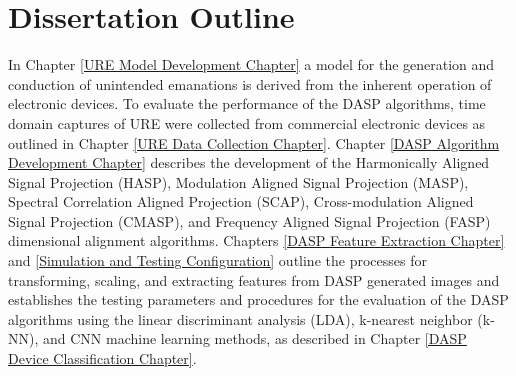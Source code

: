 \section[Dissertation Outline]{Dissertation Outline}

In Chapter \ref{URE Model Development Chapter} a model for the generation and conduction of unintended emanations is derived from the inherent operation of electronic devices.  To evaluate the performance of the DASP algorithms, time domain captures of URE were collected from commercial electronic devices as outlined in Chapter \ref{URE Data Collection Chapter}.  Chapter \ref{DASP Algorithm Development Chapter} describes the development of the Harmonically Aligned Signal Projection (HASP), Modulation Aligned Signal Projection (MASP), Spectral Correlation Aligned Projection (SCAP), Cross-modulation Aligned Signal Projection (CMASP), and Frequency Aligned Signal Projection (FASP) dimensional alignment algorithms.  Chapters \ref{DASP Feature Extraction Chapter} and \ref{Simulation and Testing Configuration} outline the processes for transforming, scaling, and extracting features from DASP generated images and establishes the testing parameters and procedures for the evaluation of the DASP algorithms using the linear discriminant analysis (LDA), k-nearest neighbor (k-NN), and CNN machine learning methods, as described in Chapter \ref{DASP Device Classification Chapter}.
 

